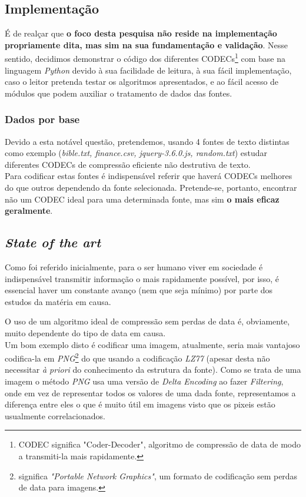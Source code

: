 \documentclass[12pt,journal,compsoc]{IEEEtran}
\begin{document}
\subsection{Implementação}


É de realçar que \textbf{o foco desta pesquisa não reside na implementação propriamente dita, mas sim na sua fundamentação e validação}. Nesse sentido, decidimos demonstrar o código dos diferentes CODECs\footnote{CODEC significa "Coder-Decoder", algoritmo de compressão de data de modo a transmiti-la mais rapidamente.} com base na linguagem \textit{Python} devido à sua facilidade de leitura, à sua fácil implementação, caso o leitor pretenda testar os algoritmos apresentados, e ao fácil acesso de módulos que podem auxiliar o tratamento de dados das fontes.

\IEEEpubidadjcol

\subsubsection{Dados por base}
Devido a esta notável questão, pretendemos, usando 4 fontes de texto distintas como exemplo (\textit{bible.txt, finance.csv, jquery-3.6.0.js, random.txt}) estudar diferentes CODECs de compressão eficiente não destrutiva de texto.\\
Para codificar estas fontes é indispensável referir que haverá CODECs melhores do que outros dependendo da fonte selecionada. Pretende-se, portanto, encontrar não um CODEC ideal para uma determinada fonte, mas sim \textbf{o mais eficaz geralmente}. 

\subsection{\textit{State of the art}}
Como foi referido inicialmente, para o ser humano viver em sociedade é indispensável transmitir informação o mais rapidamente possível, por isso, é essencial haver um constante avanço (nem que seja mínimo) por parte dos estudos da matéria em causa.


O uso de um algoritmo ideal de compressão sem perdas de data é, obviamente, muito dependente do tipo de data em causa.\\Um bom exemplo disto é codificar uma imagem, atualmente, seria mais vantajoso codifica-la em \textit{PNG}\footnote{significa \textit{"Portable Network Graphics"}, um formato de codificação sem perdas de data para imagens.} do que usando a codificação \textit{LZ77} (apesar desta não necessitar \textit{à priori} do conhecimento da estrutura da fonte). Como se trata de uma imagem o método \textit{PNG} usa uma versão de  \textit{Delta Encoding} ao fazer \textit{Filtering}, onde em vez de representar todos os valores de uma dada fonte, representamos a diferença entre eles o que é muito útil em imagens visto que os pixeis estão usualmente correlacionados.
\end{document}
